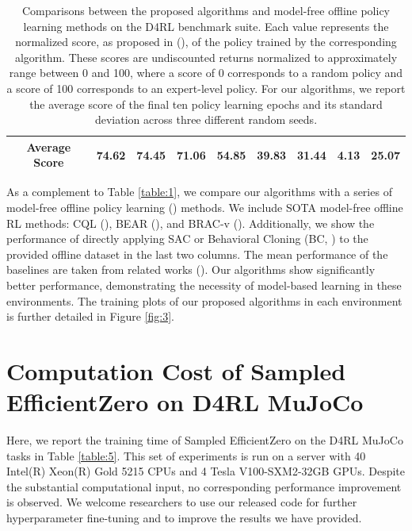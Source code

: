 \begin{table}[htbp]
\begin{tabular}{c|c|c|c|c|c|c|c|c|c}
\hline
\hline
\multicolumn{2}{c|}{Average Score} & {\textbf{74.62}} & {74.45} & {71.06} & {54.85} & {39.83} & {31.44} & {4.13} & {25.07}\\
\hline 
\end{tabular}
\caption{Comparisons between the proposed algorithms and model-free offline policy learning methods on the D4RL benchmark suite. Each value represents the normalized score, as proposed in (\cite{DBLP:journals/corr/abs-2004-07219}), of the policy trained by the corresponding algorithm. These scores are undiscounted returns normalized to approximately range between 0 and 100, where a score of 0 corresponds to a random policy and a score of 100 corresponds to an expert-level policy. For our algorithms, we report the average score of the final ten policy learning epochs and its standard deviation across three different random seeds.}
\label{table:2}
\end{table}

As a complement to Table \ref{table:1}, we compare our algorithms with a series of model-free offline policy learning (\cite{DBLP:journals/corr/abs-2402-13777}) methods. We include SOTA model-free offline RL methods: CQL (\cite{DBLP:conf/nips/KumarZTL20}), BEAR (\cite{DBLP:conf/nips/KumarFSTL19}), and BRAC-v (\cite{DBLP:journals/corr/abs-1911-11361}). Additionally, we show the performance of directly applying SAC or Behavioral Cloning (BC, \cite{DBLP:journals/corr/abs-2402-13777}) to the provided offline dataset in the last two columns. The mean performance of the baselines are taken from related works (\cite{DBLP:conf/nips/YuTYEZLFM20, DBLP:conf/nips/KidambiRNJ20, DBLP:journals/corr/abs-2004-07219}). Our algorithms show significantly better performance, demonstrating the necessity of model-based learning in these environments. The training plots of our proposed algorithms in each environment is further detailed in Figure \ref{fig:3}.

\section{Computation Cost of Sampled EfficientZero on D4RL MuJoCo} \label{CompCost}

Here, we report the training time of Sampled EfficientZero on the D4RL MuJoCo tasks in Table \ref{table:5}. This set of experiments is run on a server with 40 Intel(R) Xeon(R) Gold 5215 CPUs and 4 Tesla V100-SXM2-32GB GPUs. Despite the substantial computational input, no corresponding performance improvement is observed. We welcome researchers to use our released code for further hyperparameter fine-tuning and to improve the results we have provided.

